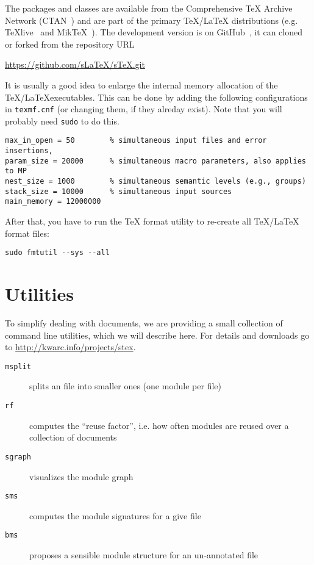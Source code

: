 \documentclass{article}
\begin{document}
The {\stex} packages and classes are available from the Comprehensive {\TeX} Archive
Network (CTAN~\cite{CTAN:on}) and are part of the primary {\TeX/\LaTeX} distributions
(e.g. TeXlive~\cite{TeXLive:on} and MikTeX~\cite{MiKTeX:on}). The development version is
on GitHub~\cite{sTeX:github:on}, it can cloned or forked from the repository URL
\begin{center}
  \url{https://github.com/sLaTeX/sTeX.git}
\end{center}
It is usually a good idea to enlarge the internal memory allocation of the \TeX/\LaTeX executables. This can be done by
adding the following configurations in \texttt{texmf.cnf} (or changing them, if they
alreday exist). Note that you will probably need \texttt{sudo} to do this. 
\begin{lstlisting}
max_in_open = 50        % simultaneous input files and error insertions, 
param_size = 20000      % simultaneous macro parameters, also applies to MP
nest_size = 1000        % simultaneous semantic levels (e.g., groups)
stack_size = 10000      % simultaneous input sources
main_memory = 12000000
\end{lstlisting}
After that, you have to run the  {\TeX} format utility to re-create all {\TeX/\LaTeX}
format files: 
\begin{lstlisting}
sudo fmtutil --sys --all
\end{lstlisting}

\section{Utilities}\label{sec:utilities}

To simplify dealing with {\stex} documents, we are providing a small collection of command
line utilities, which we will describe here. For details and downloads go to
{\url{http://kwarc.info/projects/stex}}.

\begin{description}
\item[{\texttt{msplit}}] splits an {\stex} file into smaller ones (one module per file)
\item[{\texttt{rf}}] computes the ``reuse factor'', i.e. how often {\stex} modules are reused
  over a collection of documents 
\item[{\texttt{sgraph}}] visualizes the module graph
\item[{\texttt{sms}}] computes the {\stex} module signatures for a give {\stex} file
\item[{\texttt{bms}}] proposes a sensible module structure for an un-annotated {\stex} file
\end{description}
\end{document}
